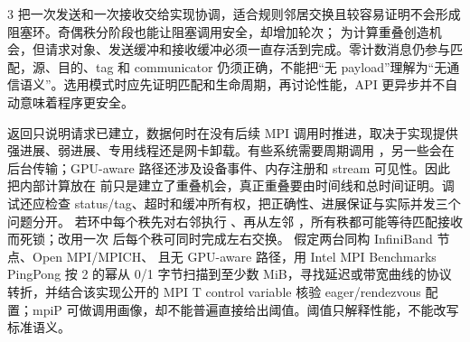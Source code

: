 \begin{solutionexercise}{3}
 把一次发送和一次接收交给实现协调，适合规则邻居交换且较容易证明不会形成阻塞环。奇偶秩分阶段也能让阻塞调用安全，却增加轮次； 为计算重叠创造机会，但请求对象、发送缓冲和接收缓冲必须一直存活到完成。零计数消息仍参与匹配，源、目的、tag 和 communicator 仍须正确，不能把“无 payload”理解为“无通信语义”。选用模式时应先证明匹配和生命周期，再讨论性能，API 更异步并不自动意味着程序更安全。

 返回只说明请求已建立，数据何时在没有后续 MPI 调用时推进，取决于实现提供强进展、弱进展、专用线程还是网卡卸载。有些系统需要周期调用 ，另一些会在后台传输；GPU-aware 路径还涉及设备事件、内存注册和 stream 可见性。因此把内部计算放在  前只是建立了重叠机会，真正重叠要由时间线和总时间证明。调试还应检查 status/tag、超时和缓冲所有权，把正确性、进展保证与实际并发三个问题分开。
\variantheading 若环中每个秩先对右邻执行 、再从左邻 ，所有秩都可能等待匹配接收而死锁；改用一次  后每个秩可同时完成左右交换。
\practiceheading 假定两台同构 InfiniBand 节点、Open MPI/MPICH、 且无 GPU-aware 路径，用 Intel MPI Benchmarks PingPong 按 2 的幂从 0/1 字节扫描到至少数 MiB，寻找延迟或带宽曲线的协议转折，并结合该实现公开的 MPI T control variable 核验 eager/rendezvous 配置；mpiP 可做调用画像，却不能普遍直接给出阈值。阈值只解释性能，不能改写标准语义。
\end{solutionexercise}
